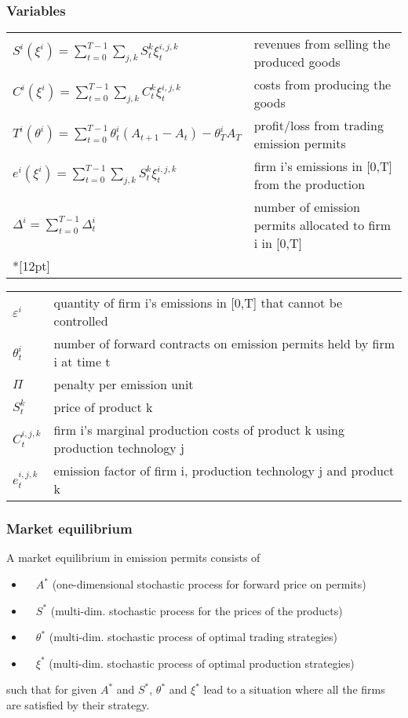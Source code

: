 \begin{frame}
\frametitle{Variables}

\begin{tiny}
\begin{tabular}{ll}
$S^i(\xi^i) =    \sum_{t=0}^{T-1} \sum_{j, k} S^k_t \xi^{i,j,k}_t$ & revenues from selling the produced goods \\
$C^i(\xi^i) =    \sum_{t=0}^{T-1} \sum_{j, k} C^k_t \xi^{i,j,k}_t$ & costs from producing the goods \\
$T^i(\theta^i) = \sum_{t=0}^{T-1} \theta^i_t (A_{t+1} - A_t) - \theta_T^i A_T$ & profit/loss from trading emission permits \\
$e^i(\xi^i) =    \sum_{t=0}^{T-1} \sum_{j, k} S^k_t \xi^{i,j,k}_t$ & firm i's emissions in [0,T] from the production\\
$\Delta^i = \sum_{t=0}^{T-1} \Delta^i_t$ & number of emission permits allocated to firm i in [0,T] \\*[12pt]
\end{tabular}

\begin{tabular}{ll}
$\varepsilon^i$ & quantity of firm i's emissions in [0,T] that cannot be controlled\\
$\theta^i_t$ & number of forward contracts on emission permits held by firm i at time t\\
$\Pi$ & penalty per emission unit \\
$S_t^k$ & price of product k\\
$C_t^{i,j,k}$ & firm i's marginal production costs of product k using production technology j\\
$e_t^{i,j,k}$ & emission factor of firm i, production technology j and product k \\
\end{tabular}
\end{tiny}
\end{frame}

\begin{frame}
\frametitle{Market equilibrium}
A market equilibrium in emission permits consists of
\begin{itemize}
\item<1->
$\quad A^*$ (one-dimensional stochastic process for forward price on permits)
\item<2-> $\quad S^*$ (multi-dim. stochastic process for the prices of the products)
\item<3-> $\quad \theta^*$ (multi-dim. stochastic process of optimal trading strategies)
\item<4-> $\quad \xi^*$ (multi-dim. stochastic process of optimal production strategies)
\end{itemize}
such that for given $A^*$ and $S^*$,
$\theta^*$ and $\xi^*$ lead to a situation where all the firms are satisfied by their strategy.
\end{frame}

